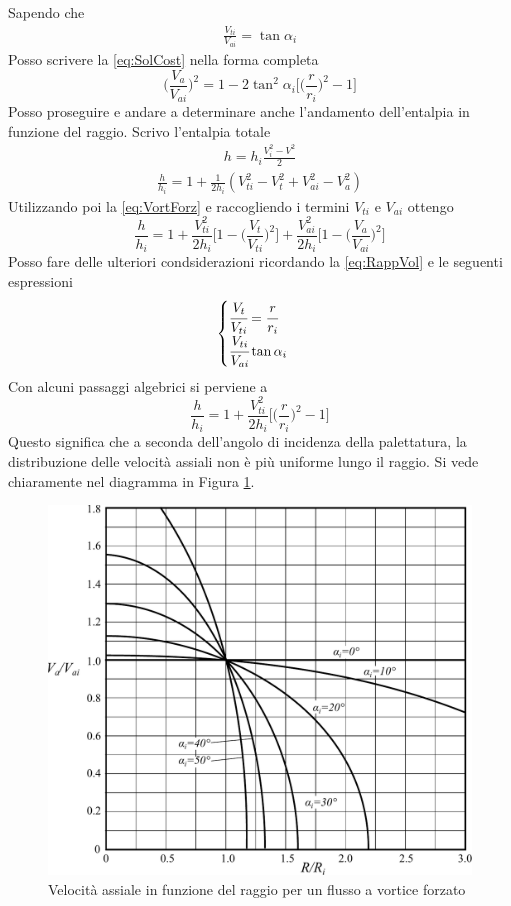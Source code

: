 Sapendo che 
\begin{align*}
\frac{V_{ti}}{V_{ai}} = \tan \alpha_i
\end{align*}
Posso scrivere la \ref{eq:SolCost} nella forma completa
\begin{equation}
\boxed{ \bigg( \frac{V_a}{V_{ai}} \bigg)^2 = 1- 2 \tan^2 \alpha_i \bigg[ \bigg( \frac{r}{r_i} \bigg)^2 -1 \bigg] }
\label{eq:RappVol}
\end{equation}
Posso proseguire e andare a determinare anche l'andamento dell'entalpia in funzione del raggio.
Scrivo l'entalpia totale
\begin{align*}
h = h_i \frac{V_i^2 - V^2}{2}
\end{align*}
\begin{align*}
\frac{h}{h_i} = 1+ \frac{1}{2 h_i} (V_{ti}^2 - V_t^2 + V_{ai}^2 -V_a^2)
\end{align*}
Utilizzando poi la \ref{eq:VortForz} e raccogliendo i termini $V_{ti}$ e $V_{ai}$ ottengo
\begin{equation}
\boxed{ \frac{h}{h_i} = 1+ \frac{V_{ti}^2}{2 h_i} \bigg[ 1- \bigg( \frac{V_t}{V_{ti}} \bigg)^2 \bigg] + \frac{V_{ai}^2}{2 h_i} \bigg[ 1- \bigg( \frac{V_a}{V_{ai}} \bigg)^2 \bigg] }
\end{equation}
Posso fare delle ulteriori condsiderazioni ricordando la \ref{eq:RappVol} e le seguenti espressioni
\begin{align*}
\begin{cases}
\cfrac{V_t}{V_{ti}} = \cfrac{r}{r_i}\\
\cfrac{V_{ti}}{V_{ai}} \tan \alpha_i
\end{cases}
\end{align*}
Con alcuni passaggi algebrici si perviene a
\begin{equation}
\boxed{ \frac{h}{h_i} = 1+ \frac{V_{ti}^2}{2h_i} \bigg[ \bigg( \frac{r}{r_i} \bigg)^2 -1 \bigg] }
\end{equation}
Questo significa che a seconda dell'angolo di incidenza della palettatura, la distribuzione delle velocità assiali non è più uniforme lungo il raggio. Si vede chiaramente nel diagramma in Figura \ref{fig:TurboFan}.
\begin{figure}
\centering
  \includegraphics[width=.8\textwidth]{fig/VortForz.pdf}
\caption{Velocità assiale in funzione del raggio per un flusso a vortice forzato}
\label{fig:TurboFan}
\end{figure}
